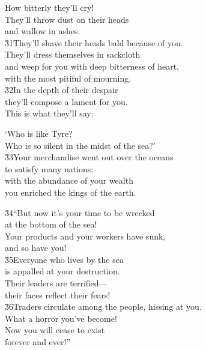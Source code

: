 \begin{poetry}
\poemlll       How bitterly they'll cry! \\
\poeml They'll throw dust on their heads \\
\poemll    and wallow in ashes. \\
\poeml \v{31}They'll shave their heads bald because of you. \\
\poemll    They'll dress themselves in sackcloth \\
\poeml and weep for you with deep bitterness of heart, \\
\poemll    with the most pitiful of mourning. \\
\poeml \v{32}In the depth of their despair \\
\poemll    they'll compose a lament for you. \\
\poeml This is what they'll say:
\end{poetry}

\begin{poetry}
\poeml `Who is like Tyre? \\
\poemll    Who is so silent in the midst of the sea?' \\
\poeml \v{33}Your merchandise went out over the oceans \\
\poemll    to satisfy many nations; \\
\poeml with the abundance of your wealth \\
\poemll    you enriched the kings of the earth.
\end{poetry}

\begin{poetry}
\poeml \v{34}``But now it's your time to be wrecked \\
\poemll    at the bottom of the sea! \\
\poeml Your products and your workers have sunk, \\
\poemll    and so have you! \\
\poeml \v{35}Everyone who lives by the sea \\
\poemll    is appalled at your destruction. \\
\poeml Their leaders are terrified--- \\
\poemll    their faces reflect their fears! \\
\poeml \v{36}Traders circulate among the people, hissing at you. \\
\poemll    What a horror you've become! \\
\poeml Now you will cease to exist \\
\poemll    forever and ever!''
\end{poetry}

